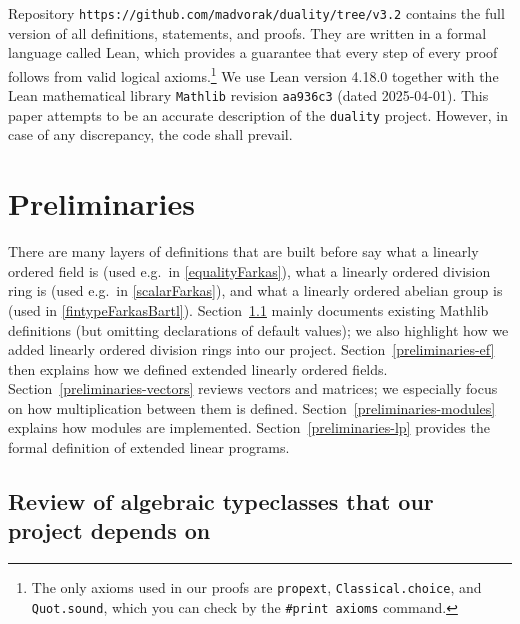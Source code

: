 \documentclass[]{article}
\renewcommand{\.}{\hskip .75pt}
\newcommand{\sekt}[1]{Section~\ref{#1}}
\begin{document}
Repository \texttt{https://github.com/madvorak/duality/tree/v3.2}
contains the full version of all definitions, statements,
and proofs. They are written in a formal language called
Lean, which provides a guarantee that every step of
every proof follows from valid logical axioms.\footnote{
The only axioms used in our proofs are
\texttt{propext}, \texttt{Classical.choice}, and
\texttt{Quot.sound}, which you can check by the
\texttt{\#print axioms} command.}
We use Lean version 4.18.0 together with the Lean
mathematical library \texttt{Mathlib} \cite{Mathlib}
revision \texttt{aa936c3} (dated 2025-04-01).
This paper attempts to be an accurate description of
the \texttt{duality} project.
However, in case of any discrepancy, the code shall prevail.

\section{Preliminaries}
\label{preliminaries}

There are many layers of definitions that are built before say
what a linearly ordered field is (used e.g.~in \ref{equalityFarkas}),
what a linearly ordered division ring is (used e.g.~in \ref{scalarFarkas}), and
what a linearly ordered abelian group is (used in \ref{fintypeFarkasBartl}).
\sekt{preliminaries-typeclasses} mainly documents existing Mathlib definitions
(but omitting declarations of default values);
we also highlight how we added linearly ordered division rings into our project.
\sekt{preliminaries-ef} then explains how we defined extended linearly ordered fields.
\sekt{preliminaries-vectors} reviews vectors and matrices; we especially focus on
how multiplication between them is defined.
\sekt{preliminaries-modules} explains how modules are implemented.
\sekt{preliminaries-lp} provides the formal definition of extended linear programs.

\subsection{Review of algebraic typeclasses that our project depends on}
\label{preliminaries-typeclasses}
\end{document}
